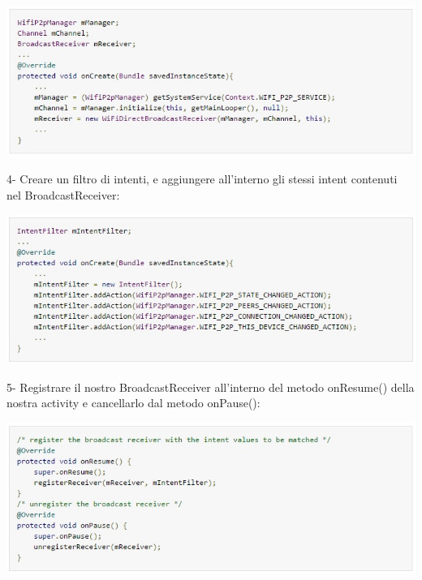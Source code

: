 \begin{center}
\includegraphics[width=1\textwidth]{imgs/onCreate.jpg}
\label{onCreate_img}%
\end{center}

4- Creare un filtro di intenti, e aggiungere all'interno gli stessi intent contenuti nel BroadcastReceiver:

\begin{center}
\includegraphics[width=1\textwidth]{imgs/intent_filter.jpg}
\label{intent_filter_img}%
\end{center}

5- Registrare il nostro BroadcastReceiver all'interno del metodo onResume() della nostra activity e cancellarlo dal metodo onPause():

\begin{center}
\includegraphics[width=1\textwidth]{imgs/register_receiver.jpg}
\label{register_receiver_img}%
\end{center}

